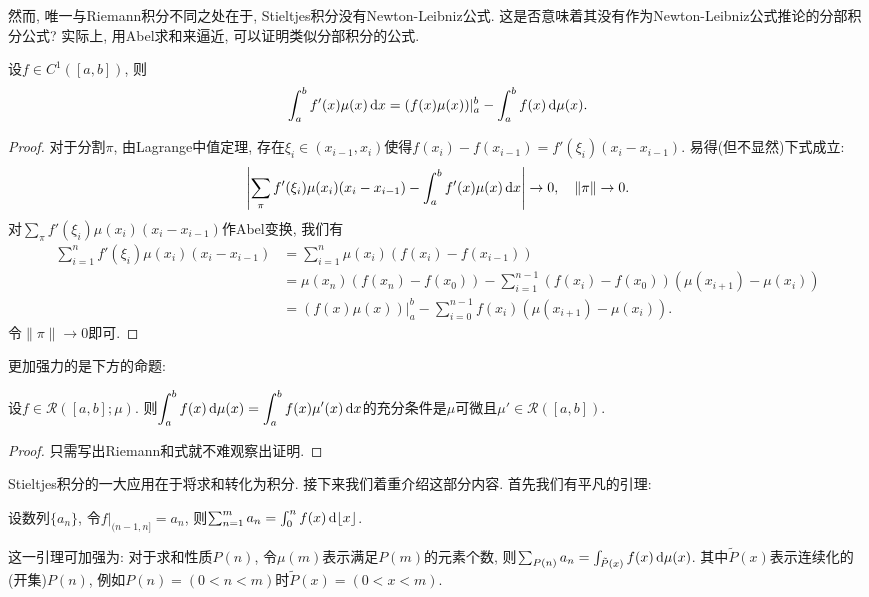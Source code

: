 然而, 唯一与Riemann积分不同之处在于, Stieltjes积分没有Newton-Leibniz公式. 这是否意味着其没有作为Newton-Leibniz公式推论的分部积分公式? 实际上, 用Abel求和来逼近, 可以证明类似分部积分的公式. 

\begin{proposition}{}
	设$f \in C^1([a,b])$, 则$$\int_a^b f'(x)\mu (x) \mathop{}\!\mathrm{d} x = (f(x)\mu (x)) |_a^b - \int_a^b f(x) \mathop{}\!\mathrm{d} \mu (x) .$$
\end{proposition}
\begin{proof}
	对于分割$\pi$, 由Lagrange中值定理, 存在$\xi _i \in (x_{i-1},x_i)$使得$f(x_i)-f(x_{i-1})=f'(\xi _i)(x_i-x_{i-1})$. 易得(但不显然)下式成立: $$\left| \sum_{\pi} f'(\xi _i)\mu (x_i)(x_i-x_{i-1})-\int_a^b f'(x) \mu (x) \mathop{}\!\mathrm{d} x \right| \to 0,\quad \| \pi \| \to 0. $$
	对$\sum_{\pi} f'(\xi _i)\mu (x_i)(x_i-x_{i-1})$作Abel变换, 我们有
	\begin{align*}
		\sum_{i=1}^{n} f'(\xi _i)\mu (x_i)(x_i-x_{i-1}) &= \sum_{i=1}^{n} \mu (x_i)(f(x_i)-f(x_{i-1})) \\
		&= \mu (x_n)(f(x_n)-f(x_0)) - \sum_{i=1}^{n-1} (f(x_i)-f(x_0))(\mu (x_{i+1})-\mu (x_i)) \\
		&= (f(x)\mu (x))|_a^b - \sum_{i=0}^{n-1} f(x_i)(\mu (x_{i+1})-\mu (x_i)). 
	\end{align*}
	令$\| \pi \|\to 0$即可. 
\end{proof}

更加强力的是下方的命题: 

\begin{proposition}{}
	设$f \in \mathcal{R}([a,b];\mu)$. 则$\displaystyle \int_a^b f(x) \mathop{}\!\mathrm{d} \mu (x) = \int_a^b f(x) \mu' (x) \mathop{}\!\mathrm{d} x$的充分条件是$\mu$可微且$\mu ' \in \mathcal{R}([a,b])$. 	
\end{proposition}
\begin{proof}
	只需写出Riemann和式就不难观察出证明. 
\end{proof}

Stieltjes积分的一大应用在于将求和转化为积分. 接下来我们着重介绍这部分内容. 首先我们有平凡的引理: 


\begin{lemma}{}
	设数列$\{ a_n \}$, 令$f|_{(n-1,n]}=a_n$, 则$\sum_{n=1}^{m} a_n = \int_0^n f(x) \mathop{}\!\mathrm{d} \lfloor x \rfloor$. 
\end{lemma}

这一引理可加强为: 对于求和性质$P(n)$, 令$\mu (m)$表示满足$P(m)$的元素个数, 则$\sum_{P(n)} a_n = \int_{\tilde{P}(x)} f(x) \mathop{}\!\mathrm{d} \mu (x)$. 其中$\tilde{P}(x)$表示连续化的(开集)$P(n)$, 例如$P(n)=(0<n<m)$时$\tilde{P}(x)=(0<x<m)$. 

